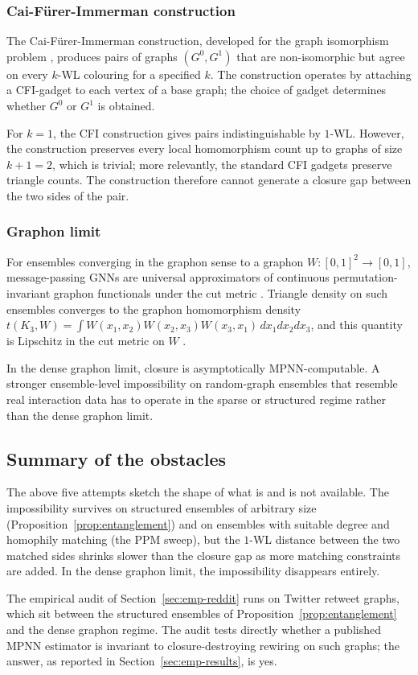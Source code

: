 \subsubsection*{Cai-F\"{u}rer-Immerman construction}

The Cai-F\"{u}rer-Immerman construction, developed for the graph
isomorphism problem \citep{CFI1992}, produces pairs of graphs $(G^0,
G^1)$ that are non-isomorphic but agree on every $k$-WL colouring
for a specified $k$. The construction operates by attaching a
CFI-gadget to each vertex of a base graph; the choice of gadget
determines whether $G^0$ or $G^1$ is obtained.

For $k = 1$, the CFI construction gives pairs indistinguishable by
$1$-WL. However, the construction preserves every local homomorphism
count up to graphs of size $k + 1 = 2$, which is trivial; more
relevantly, the standard CFI gadgets preserve triangle counts. The
construction therefore cannot generate a closure gap between the two
sides of the pair.

\subsubsection*{Graphon limit}

For ensembles converging in the graphon sense to a graphon $W : [0,
1]^2 \to [0, 1]$, message-passing GNNs are universal approximators
of continuous permutation-invariant graphon functionals under the
cut metric \citep{KerivenPeyre2020, RuizChamonRibeiro2021}. Triangle
density on such ensembles converges to the graphon homomorphism
density $t(K_3, W) = \int W(x_1, x_2) W(x_2, x_3) W(x_3, x_1) \,
dx_1 dx_2 dx_3$, and this quantity is Lipschitz in the cut metric
on $W$ \citep{LovaszBook}.

In the dense graphon limit, closure is asymptotically MPNN-computable.
A stronger ensemble-level impossibility on random-graph ensembles
that resemble real interaction data has to operate in the sparse or
structured regime rather than the dense graphon limit.

\subsection{Summary of the obstacles}

The above five attempts sketch the shape of what is and is not
available. The impossibility survives on structured ensembles of
arbitrary size (Proposition~\ref{prop:entanglement}) and on ensembles with
suitable degree and homophily matching (the PPM sweep), but the
$1$-WL distance between the two matched sides shrinks slower than
the closure gap as more matching constraints are added. In the dense
graphon limit, the impossibility disappears entirely.

The empirical audit of Section~\ref{sec:emp-reddit} runs on Twitter
retweet graphs, which sit between the structured ensembles of
Proposition~\ref{prop:entanglement} and the dense graphon regime. The audit
tests directly whether a published MPNN estimator is invariant to
closure-destroying rewiring on such graphs; the answer, as reported
in Section~\ref{sec:emp-results}, is yes.
